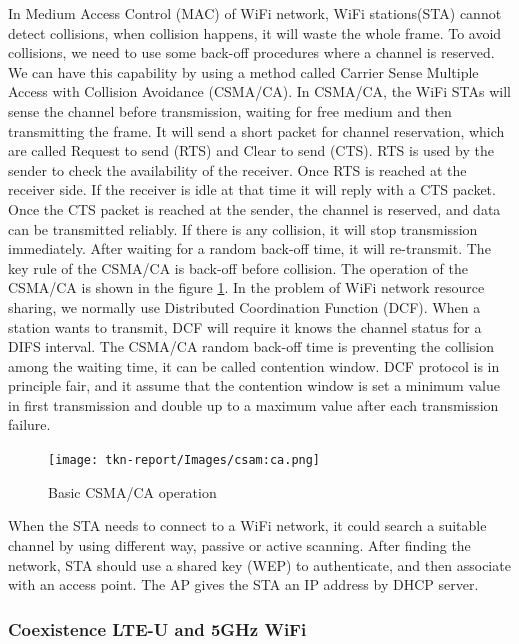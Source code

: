 \documentclass{IEEEtran}
\begin{document}
In Medium Access Control (MAC) of WiFi network, WiFi stations(STA) cannot detect collisions, when collision happens, it will waste the whole frame. To avoid collisions, we need to use some back-off procedures where a channel is reserved. We can have this capability by using a method called Carrier Sense Multiple Access with Collision Avoidance (CSMA/CA). In CSMA/CA, the WiFi STAs will sense the channel before transmission, waiting for free medium and then transmitting the frame. It will send a short packet for channel reservation, which are called Request to send (RTS) and Clear to send (CTS). RTS is used by the sender to check the availability of the receiver. Once RTS is reached at the receiver side. If the receiver is idle at that time it will reply with a CTS packet. Once the CTS packet is reached at the sender, the channel is reserved, and data can be transmitted reliably. If there is any collision, it will stop transmission immediately. After waiting for a random back-off time, it will re-transmit. The key rule of the CSMA/CA is back-off before collision. The operation of the CSMA/CA is shown in the figure \ref{csma-operation}. In the problem of WiFi network resource sharing, we normally use Distributed Coordination Function (DCF). When a station wants to transmit, DCF will require it knows the channel status for a DIFS interval. The CSMA/CA random back-off time is preventing the collision among the waiting time, it can be called contention window. DCF protocol is in principle fair, and it assume that the contention window is set a minimum value in first transmission and double up to a maximum value after each transmission failure\cite{Tinnirello2011}.

\graphicspath{{Images/}}
\maketitle
\begin{figure}[htp]
\centering
\texttt{[image: tkn-report/Images/csam:ca.png]}
\caption{Basic CSMA/CA operation}
\label{csma-operation}
\end{figure}


When the STA needs to connect to a WiFi network, it could search a suitable channel by using different way, passive or active scanning. After finding the network, STA should use a shared key (WEP) to authenticate, and then associate with an access point. The AP gives the STA an IP address by DHCP server.

\subsubsection{Coexistence LTE-U and 5GHz WiFi }
\end{document}
